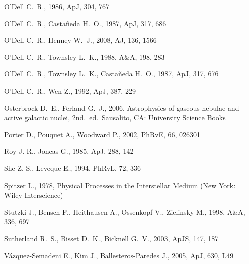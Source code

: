 \documentclass[useAMS,usenatbib]{mn2e}
\begin{document}
\begin{thebibliography}{}
 O'Dell 
C.~R., 1986, ApJ, 304, 767 

 O'Dell C.~R., Casta\~neda H.~O., 1987, ApJ, 317, 686 

 O'Dell C.~R., Henney W.~J., 2008, AJ, 136, 1566 

 O'Dell C.~R., Townsley L.~K., 1988, A\&A, 198, 283 

 O'Dell C.~R., Townsley
  L.~K., Casta\~neda H.~O., 1987, ApJ, 317, 676 

 O'Dell C.~R., Wen Z., 1992, ApJ, 387, 229 

 Osterbrock D.~E., Ferland
  G.~J., 2006, Astrophysics of gaseous nebulae and active galactic
  nuclei, 2nd.~ed.~Sausalito, CA:
  University Science Books

 Porter D., Pouquet A., Woodward P., 2002, PhRvE, 66, 026301 

 Roy J.-R., Joncas G., 1985, ApJ, 288, 142 

 She Z.-S., Leveque E., 1994, PhRvL, 72, 336 

 Spitzer
  L., 1978, Physical Processes in the Interstellar Medium (New York: Wiley-Interscience)

 Stutzki J., Bensch F., Heithausen A., Ossenkopf V., Zielinsky M., 1998, A\&A, 336, 697 

 Sutherland R.~S., Bisset
  D.~K., Bicknell G.~V., 2003, ApJS, 147, 187 

 V{\'a}zquez-Semadeni E., Kim J., Ballesteros-Paredes J., 2005, ApJ, 630, L49 


\end{thebibliography}
\end{document}
